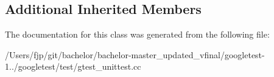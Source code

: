 \subsection*{Additional Inherited Members}


The documentation for this class was generated from the following file\+:\begin{DoxyCompactItemize}
\item 
/\+Users/fjp/git/bachelor/bachelor-\/master\+\_\+updated\+\_\+vfinal/googletest-\/1../googletest/test/gtest\+\_\+unittest.\+cc\end{DoxyCompactItemize}
